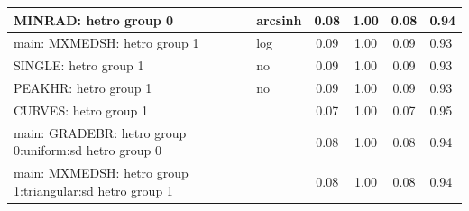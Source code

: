 \begin{table}
\begin{center}
\begin{tabular}{|l|l|c|c|c|l|}
			\hline
			MINRAD: hetro group 0 & arcsinh & 0.08 & 1.00 & 0.08 & 0.94 \\
			\hline
			main: MXMEDSH: hetro group 1 & log & 0.09 & 1.00 & 0.09 & 0.93 \\
			\hline
			SINGLE: hetro group 1 & no & 0.09 & 1.00 & 0.09 & 0.93 \\
			\hline
			PEAKHR: hetro group 1 & no & 0.09 & 1.00 & 0.09 & 0.93 \\
			\hline
			CURVES: hetro group 1 &  & 0.07 & 1.00 & 0.07 & 0.95 \\
			\hline
			main: GRADEBR: hetro group 0:uniform:sd  hetro group 0 &  & 0.08 & 1.00 & 0.08 & 0.94 \\
			\hline
			main: MXMEDSH: hetro group 1:triangular:sd  hetro group 1 &  & 0.08 & 1.00 & 0.08 & 0.94 \\
			\hline
		\end{tabular}
	\end{center}
\end{table}